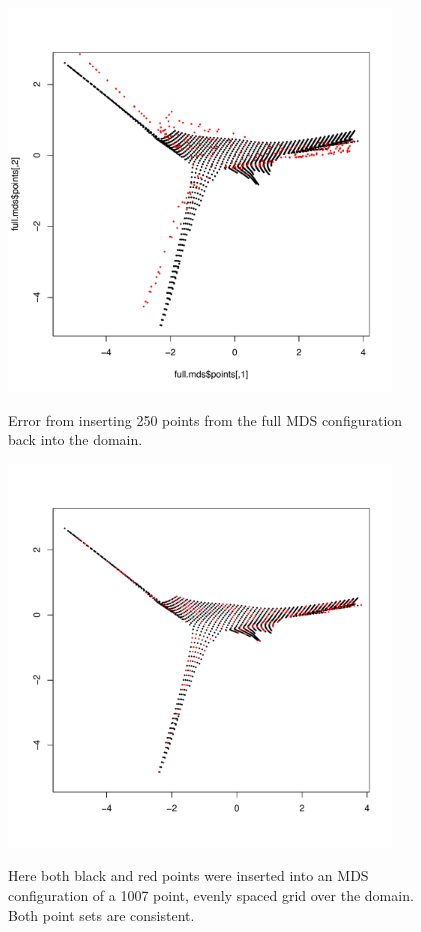 \documentclass[a4paper,10pt]{article}
\newcommand{\fig}[1]{\emph{fig.} \ref{#1}}
\begin{document}
\begin{figure}
\centering
\includegraphics[width=4in]{figs/wt2-gowererr-fullover.pdf} \\
\caption{Error from inserting 250 points from the full MDS configuration back into the domain.}
\label{gowerfullinsert}
\end{figure}



\begin{figure}
\centering
\includegraphics[width=4in]{figs/wt2-double-insert.pdf} \\
\caption{Here both black and red points were inserted into an MDS configuration of a 1007 point, evenly spaced grid over the domain. Both point sets are consistent.}
\label{wt2-double-insert}
\end{figure}
\end{document}
